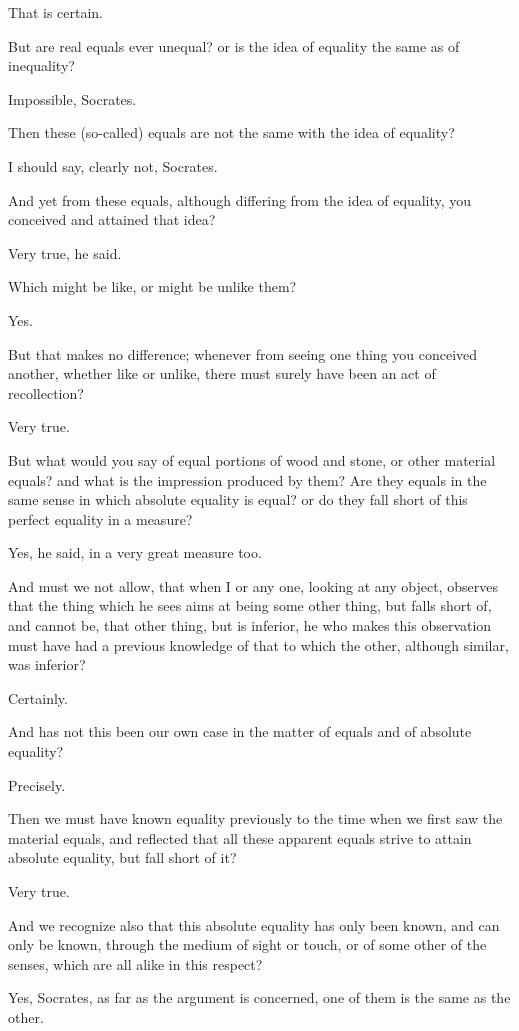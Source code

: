 That is certain.

But are real equals ever unequal? or is the idea of equality the same as
of inequality?

Impossible, Socrates.

Then these (so-called) equals are not the same with the idea of equality?

I should say, clearly not, Socrates.

And yet from these equals, although differing from the idea of equality,
you conceived and attained that idea?

Very true, he said.

Which might be like, or might be unlike them?

Yes.

But that makes no difference; whenever from seeing one thing you conceived
another, whether like or unlike, there must surely have been an act of
recollection?

Very true.

But what would you say of equal portions of wood and stone, or other
material equals? and what is the impression produced by them? Are they
equals in the same sense in which absolute equality is equal? or do they
fall short of this perfect equality in a measure?

Yes, he said, in a very great measure too.

And must we not allow, that when I or any one, looking at any object,
observes that the thing which he sees aims at being some other thing, but
falls short of, and cannot be, that other thing, but is inferior, he who
makes this observation must have had a previous knowledge of that to which
the other, although similar, was inferior?

Certainly.

And has not this been our own case in the matter of equals and of absolute
equality?

Precisely.

Then we must have known equality previously to the time when we first saw
the material equals, and reflected that all these apparent equals strive
to attain absolute equality, but fall short of it?

Very true.

And we recognize also that this absolute equality has only been known, and
can only be known, through the medium of sight or touch, or of some other
of the senses, which are all alike in this respect?

Yes, Socrates, as far as the argument is concerned, one of them is the
same as the other.

